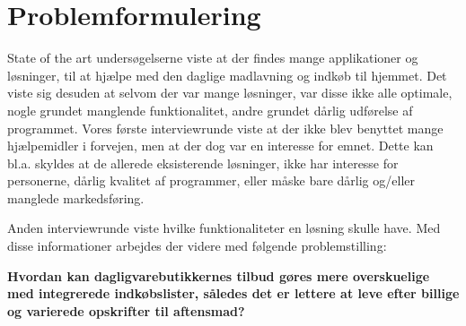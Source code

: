 \section{Problemformulering}\label{section:problemformulering}

State of the art undersøgelserne viste at der findes mange applikationer og løsninger, til at hjælpe med den daglige madlavning og indkøb til hjemmet.
Det viste sig desuden at selvom der var mange løsninger, var disse ikke alle optimale, nogle grundet manglende funktionalitet, andre grundet dårlig udførelse af programmet.
Vores første interviewrunde viste at der ikke blev benyttet mange hjælpemidler i forvejen, men at der dog var en interesse for emnet.
Dette kan bl.a. skyldes at de allerede eksisterende løsninger, ikke har interesse for personerne, dårlig kvalitet af programmer, eller måske bare dårlig og/eller manglede markedsføring. 

Anden interviewrunde viste hvilke funktionaliteter en løsning skulle have.
Med disse informationer arbejdes der videre med følgende problemstilling:


\textbf{Hvordan kan dagligvarebutikkernes tilbud gøres mere overskuelige med integrerede indkøbslister, således det er lettere at leve efter billige og varierede opskrifter til aftensmad?}

